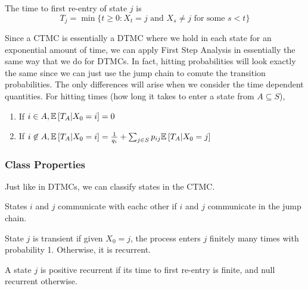 \begin{definition}
	The time to first re-entry of state $j$ is \[
		T_j = \min \{t \geq 0: X_t=j \text{ and } X_s \neq j \text{ for some } s < t\}
	\]
	\label{defn:ctmc-reentry}
\end{definition}
Since a CTMC is essentially a DTMC where we hold in each state for an exponential amount of time, we can apply First Step Analysis in essentially the same way that we do for DTMCs.
In fact, hitting probabilities will look exactly the same since we can just use the jump chain to comute the transition probabilities.
The only differences will arise when we consider the time dependent quantities.
For hitting times (how long it takes to enter a state from $A\subseteq S$),
\begin{enumerate}
	\item If $i\in A, \mathbb{E}\left[T_A|X_0=i\right] = 0$
	\item If $i \not \in A, \mathbb{E}\left[T_A|X_0=i\right] = \frac{1}{q_i} + \sum_{j\in S} p_{ij}\mathbb{E}\left[T_A|X_0=j\right]$
\end{enumerate}
\subsubsection{Class Properties}
Just like in DTMCs, we can classify states in the CTMC.
\begin{definition}
	States $i$ and $j$ communicate with eachc other if $i$ and $j$ communicate in the jump chain.
	\label{defn:ctmc-communicate}
\end{definition}
\begin{definition}
	State $j$ is transient if given $X_0=j$, the process enters $j$ finitely many times with probability 1. Otherwise, it is recurrent.
	\label{defn:ctmc-recurrent}
\end{definition}
\begin{definition}
	A state $j$ is positive recurrent if its time to first re-entry is finite, and null recurrent otherwise.
	\label{defn:ctmc-recurrence}
\end{definition}
